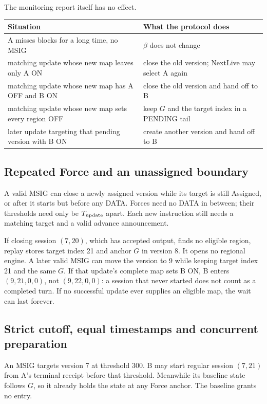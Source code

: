 \documentclass[11pt,a4paper]{article}
\newcounter{protocol}
\begin{document}
The monitoring report itself has no effect.
\begin{center}\small
\begin{tabularx}{\linewidth}{@{}>{\raggedright\arraybackslash}p{.45\linewidth}Y@{}}\toprule
Situation & What the protocol does\\\midrule
A misses blocks for a long time, no MSIG & $\beta$ does not change\\
matching update whose new map leaves only A ON & close the old version; NextLive may select A again\\
matching update whose new map has A OFF and B ON & close the old version and hand off to B\\
matching update whose new map sets every region OFF & keep $G$ and the target index in a PENDING tail\\
later update targeting that pending version with B ON & create another version and hand off to B\\\bottomrule
\end{tabularx}
\end{center}

\subsection{Repeated Force and an unassigned boundary}
\label{sec:repeated-force}
A valid MSIG can close a newly assigned version while its target is
still Assigned, or after it starts but before any DATA. Forces need no DATA
in between; their thresholds need only be $T_{\rm update}$ apart. Each
new instruction still needs a matching
target and a valid advance announcement.

If closing session $(7,20)$, which has accepted output, finds no eligible
region, replay stores target index 21 and anchor $G$ in version 8. It
opens no regional engine. A later valid MSIG can move the version to 9
while keeping target index 21 and the same $G$. If that update's complete
map sets B ON, B enters $(9,21,0,0)$, not $(9,22,0,0)$: a session that
never started does not count as a completed turn. If no successful update
ever supplies an eligible map, the wait can last forever.

\subsection{Strict cutoff, equal timestamps and concurrent preparation}
\label{sec:cutoff-example}
An MSIG targets version 7 at threshold 300. B may start regular session
$(7,21)$ from A's terminal receipt before that threshold. Meanwhile its
baseline state follows $G$, so it already holds the state at any Force
anchor. The baseline grants no entry.
\end{document}
